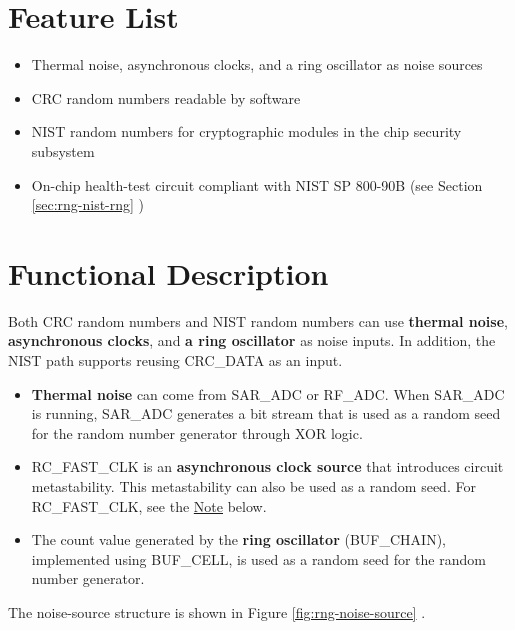 \documentclass[main\_\_EN.tex]{subfiles}
\begin{document}

\section{Feature List}
\label{sec:rng-features}

\begin{itemize}
    \item Thermal noise, asynchronous clocks, and a ring oscillator as noise sources
    \item CRC random numbers readable by software
    \item NIST random numbers for cryptographic modules in the chip security subsystem
    \item On-chip health-test circuit compliant with NIST SP 800-90B (see Section \ref{sec:rng-nist-rng} \textit{})
\end{itemize}


\section{Functional Description}
\label{sec:rng-func-descr}

Both CRC random numbers and NIST random numbers can use \textbf{thermal noise}, \textbf{asynchronous clocks}, and \textbf{a ring oscillator} as noise inputs. In addition, the NIST path supports reusing CRC\_DATA as an input.

\begin{itemize}
    \item \textbf{Thermal noise} can come from SAR\_ADC or RF\_ADC. When SAR\_ADC is running, SAR\_ADC generates a bit stream that is used as a random seed for the random number generator through XOR logic.
    \item RC\_FAST\_CLK is an \textbf{asynchronous clock source} that introduces circuit metastability. This metastability can also be used as a random seed. For RC\_FAST\_CLK, see the \hyperref[others:rng-note-clock-seed]{Note} below.
    \item The count value generated by the \textbf{ring oscillator} (BUF\_CHAIN), implemented using BUF\_CELL, is used as a random seed for the random number generator.
\end{itemize}
The noise-source structure is shown in Figure \ref{fig:rng-noise-source} \textit{}.
\vspace{2em}
\end{document}
